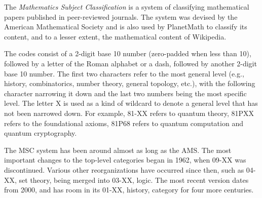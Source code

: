 \documentclass[12pt]{article}
\begin{document}
The {\em Mathematics Subject Classification} is a system of classifying mathematical papers published in peer-reviewed journals. The system was devised by the American Mathematical Society and is also used by PlanetMath to classify its content, and to a lesser extent, the mathematical content of Wikipedia.

The codes consist of a 2-digit base 10 number (zero-padded when less than 10), followed by a letter of the Roman alphabet or a dash, followed by another 2-digit base 10 number. The first two characters refer to the most general level (e.g., history, combinatorics, number theory, general topology, etc.), with the following character narrowing it down and the last two numbers being the most specific level. The letter X is used as a kind of wildcard to denote a general level that has not been narrowed down. For example, 81-XX refers to quantum theory, 81PXX refers to the foundational axioms, 81P68 refers to quantum computation and quantum cryptography.

The MSC system has been around almost as long as the AMS. The most important changes to the top-level categories began in 1962, when 09-XX was discontinued. Various other reorganizations have occurred since then, such as 04-XX, set theory, being merged into 03-XX, logic. The most recent version dates from 2000, and has room in its 01-XX, history, category for four more centuries.
\end{document}
